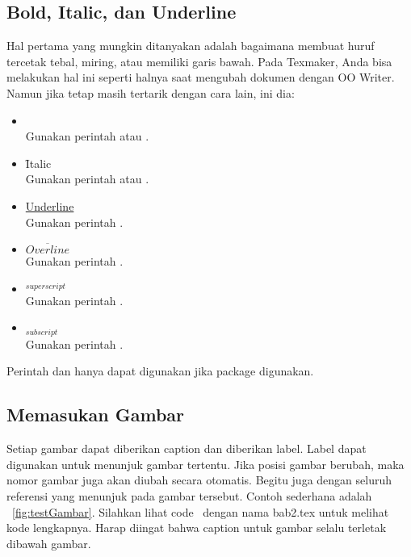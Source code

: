 \subsection{Bold, Italic, dan Underline}
\label{sec:latexBIU}
Hal pertama yang mungkin ditanyakan adalah bagaimana membuat huruf tercetak tebal, miring, atau memiliki garis bawah.
Pada Texmaker, Anda bisa melakukan hal ini seperti halnya saat mengubah dokumen dengan OO Writer.
Namun jika tetap masih tertarik dengan cara lain, ini dia:

\begin{itemize}
	\item {} \\
	Gunakan perintah  atau
	.
	\item \f{Italic} \\
	Gunakan perintah  atau
	.
	\item \underline{Underline} \\
	Gunakan perintah .
	\item $\overline{Overline}$ \\
	Gunakan perintah .
	\item $^{superscript}$ \\
	Gunakan perintah \code{\bslash{}$\lbrace\rbrace$}.
	\item $_{subscript}$ \\
	Gunakan perintah \code{\bslash{}\_$\lbrace\rbrace$}.
\end{itemize}

Perintah  dan  hanya dapat digunakan jika package  digunakan.

\subsection{Memasukan Gambar}
\label{sec:latexImage}
Setiap gambar dapat diberikan caption dan diberikan label. Label dapat digunakan untuk menunjuk gambar tertentu.
Jika posisi gambar berubah, maka nomor gambar juga akan diubah secara otomatis.
Begitu juga dengan seluruh referensi yang menunjuk pada gambar tersebut.
Contoh sederhana adalah \pic~\ref{fig:testGambar}.
Silahkan lihat code \latex~dengan nama bab2.tex untuk melihat kode lengkapnya.
Harap diingat bahwa caption untuk gambar selalu terletak dibawah gambar.

